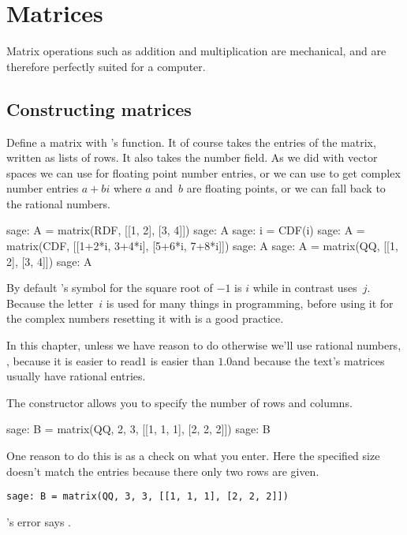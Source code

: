 \chapter{Matrices}

Matrix operations such as addition and multiplication
are mechanical, and are therefore perfectly suited for 
a computer.



\section{Constructing matrices}
Define a matrix with \Sage's  function.
It of course takes the entries of the matrix, written as lists of rows.
It also takes the number field.
As we did with vector spaces we can use  for 
floating point number entries, 
or we can use  to get complex number entries $a+bi$ where 
$a$ and~$b$ are floating points,
or we can fall back to the rational numbers.
\begin{sagecommandline}
sage: A = matrix(RDF, [[1, 2], [3, 4]])
sage: A
sage: i = CDF(i)
sage: A = matrix(CDF, [[1+2*i, 3+4*i], [5+6*i, 7+8*i]])
sage: A
sage: A = matrix(QQ, [[1, 2], [3, 4]])
sage: A                           
\end{sagecommandline}
\noindent
By default \Sage's symbol for the square root of $-1$ is $i$ 
while in contrast \python{} uses~$j$.
Because the letter~$i$ is used for many things in programming,
before using it for the complex numbers
resetting it with  is a good practice.

In this chapter, unless we have reason to do otherwise
we'll use rational numbers, , 
because it is easier to read\Dash $1$ is easier than $1.0$\Dash and 
because the text's matrices usually have rational entries.

The  constructor allows you to specify the number of
rows and columns.
\begin{sagecommandline}
sage: B = matrix(QQ, 2, 3, [[1, 1, 1], [2, 2, 2]])  
sage: B
\end{sagecommandline}
One reason to do this is as a check on what you enter.
Here the specified size doesn't match the entries because
there only two rows are given. 
\begin{lstlisting}[style=python]
sage: B = matrix(QQ, 3, 3, [[1, 1, 1], [2, 2, 2]])  
\end{lstlisting}
\Sage's error says
.

